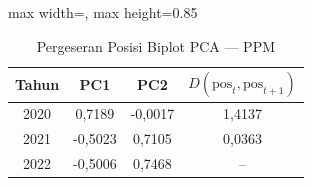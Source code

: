 \begin{table}[H]
\centering
\caption{Pergeseran Posisi Biplot PCA --- PPM} \label{tab:samplejarak_pca_loading_ppm}
\begin{adjustbox}{max width=\textwidth, max height=0.85\textheight}
\begin{tabular}{|c|c|c|c|}
\hline
\textbf{Tahun} & \textbf{PC1} & \textbf{PC2} & \textbf{$D(\text{pos}_t, \text{pos}_{t+1})$} \\
\hline
2020 & 0,7189 & -0,0017 & 1,4137 \\
2021 & -0,5023 & 0,7105 & 0,0363 \\
2022 & -0,5006 & 0,7468 & -- \\
\hline
\end{tabular}
\end{adjustbox}
\end{table}